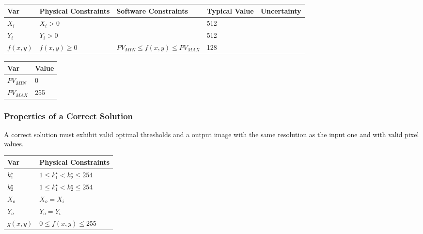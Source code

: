 \documentclass[12pt]{article}
\begin{document}
\begin{table}[!h]
  \caption{Input Variables} \label{TblInputVar}
  \renewcommand{\arraystretch}{1.2}
\noindent \begin{longtable*}{l l l l c} 
  \toprule
\textbf{Var} & \textbf{Physical Constraints} & \textbf{Software Constraints} &
\textbf{Typical Value} & \textbf{Uncertainty}\\
  \midrule 
  $X_i$ & $X_i > 0$ & & 512 & 
  \\
  $Y_i$ & $Y_i > 0$ & & 512 & 
  \\
  $f(x,y)$ & $f(x,y) \ge 0$ & $PV_{MIN} \le f(x,y) \le PV_{MAX}$ & 128 & 
  \\
  \bottomrule
\end{longtable*}
\end{table}

\begin{table}[!h]
\caption{Specification Parameter Values} \label{TblSpecParams}
\renewcommand{\arraystretch}{1.2}
\noindent \begin{longtable*}{l l} 
  \toprule
  \textbf{Var} & \textbf{Value} \\
  \midrule 
  $PV_{MIN}$ & 0\\
  $PV_{MAX}$ & 255\\
  \bottomrule
\end{longtable*}
\end{table}

\subsubsection{Properties of a Correct Solution} \label{sec_CorrectSolution}

\noindent
A correct solution must exhibit valid optimal thresholds and a output image
with the same resolution as the input one and with valid pixel values.

\begin{table}[!h]
\caption{Output Variables} \label{TblOutputVar}
\renewcommand{\arraystretch}{1.2}
\noindent \begin{longtable*}{l l} 
  \toprule
  \textbf{Var} & \textbf{Physical Constraints} \\
  \midrule 
  $k^{\star}_{1}$ & $1 \le k^{\star}_{1} < k^{\star}_{2} \le 254$\\
  $k^{\star}_{2}$ & $1 \le k^{\star}_{1} < k^{\star}_{2} \le 254$\\
  $X_o$ & $X_o = X_i$\\
  $Y_o$ & $Y_o = Y_i$\\
  $g(x,y)$ & $0 \le f(x,y) \le 255$ 
  \\
  \bottomrule
\end{longtable*}
\end{table}
\end{document}
